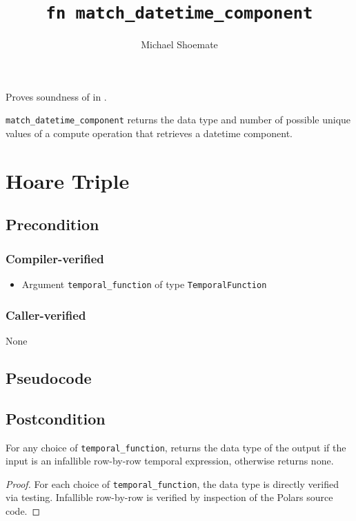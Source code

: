 \documentclass{article}
\title{\texttt{fn match\_datetime\_component}}
\author{Michael Shoemate}
\date{}
\begin{document}
\maketitle

\contrib
Proves soundness of  in .

\texttt{match\_datetime\_component} returns the data type and number of possible unique values of a compute operation that retrieves a datetime component.

\section{Hoare Triple}
\subsection*{Precondition}
\subsubsection*{Compiler-verified}
\begin{itemize}
    \item Argument \texttt{temporal\_function} of type \texttt{TemporalFunction} 
\end{itemize}

\subsubsection*{Caller-verified}
None

\subsection*{Pseudocode}


\subsection*{Postcondition}
\begin{theorem}
    For any choice of \texttt{temporal\_function},
    returns the data type of the output if the input is an infallible row-by-row temporal expression,
    otherwise returns none.
\end{theorem}

\begin{proof}
    For each choice of \texttt{temporal\_function}, 
    the data type is directly verified via testing.
    Infallible row-by-row is verified by inspection of the Polars source code.
\end{proof}
\end{document}
